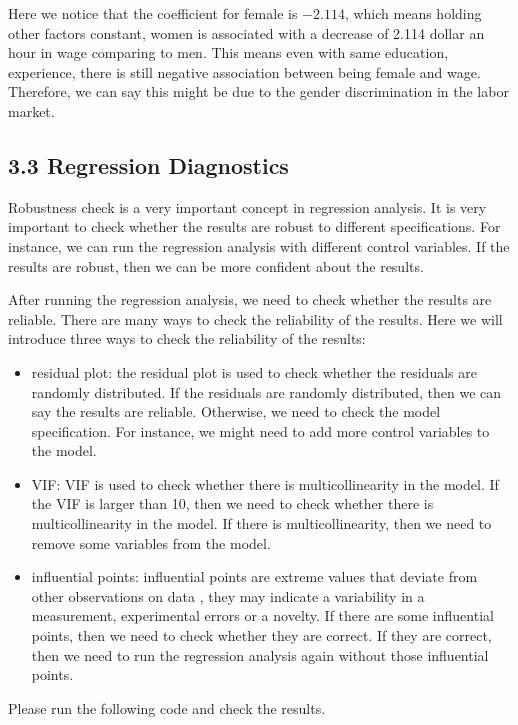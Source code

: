 \documentclass[11pt]{article}
\theoremstyle{definition}
\providecommand{\tightlist}{%
\setlength{\itemsep}{0pt}\setlength{\parskip}{0pt}}
\begin{document}
Here we notice that the coefficient for female is  $-2.114$, 
which means holding other factors constant, women is associated with 
a decrease of 2.114 dollar an hour in wage comparing to men. This 
means even with same education, experience, there is still negative 
association between being female and wage. Therefore, we can say this 
might be due to the gender discrimination in the labor market.

\subsection{3.3 Regression Diagnostics}


Robustness check is a very important concept in regression analysis. 
It is very important to check whether the results are robust to 
different specifications. For instance, we can run the regression analysis 
with different control variables. If the results are robust, then we 
can be more confident about the results.


After running the regression analysis, we need to check whether the results are 
reliable. There are many ways to check the reliability of the results. 
Here we will introduce three ways to check the reliability of the results:

\begin{itemize}
  \tightlist
  \item residual plot: the residual plot is used to check whether the residuals are randomly distributed. If the residuals are randomly distributed, then we can say the results are reliable. Otherwise, we need to check the model specification. For instance, we might need to add more control variables to the model.
  \item VIF: VIF is used to check whether there is multicollinearity in the model. If the VIF is larger than 10, then we need to check whether there is multicollinearity in the model. If there is multicollinearity, then we need to remove some variables from the model.
  \item influential points: influential points are extreme values that deviate from other observations on data , they may indicate a variability in a measurement, experimental errors or a novelty. If there are some influential points, then we need to check whether they are correct. If they are correct, then we need to run the regression analysis again without those influential points.
\end{itemize}


Please run the following code and check the results.
\end{document}
